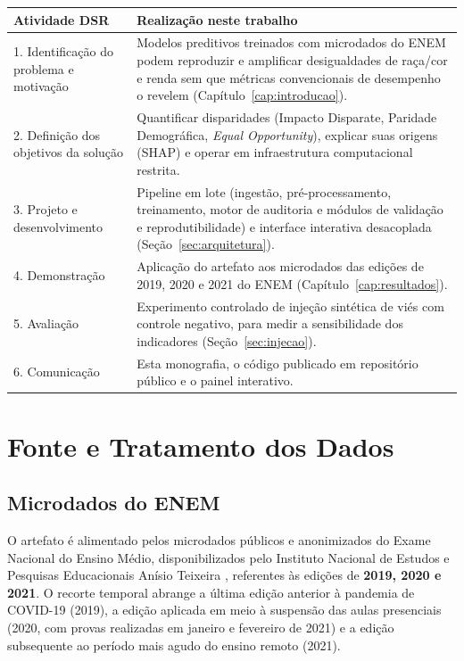 \begin{quadro}[htbp]
\centering
\caption{Mapeamento das atividades da DSR para o presente trabalho}
\label{qua:dsr}
\begin{tabular}{|p{4.2cm}|p{10.3cm}|}
\hline
\textbf{Atividade DSR} & \textbf{Realização neste trabalho} \\ \hline
1. Identificação do problema e motivação & Modelos preditivos treinados com microdados do ENEM podem reproduzir e amplificar desigualdades de raça/cor e renda sem que métricas convencionais de desempenho o revelem (Capítulo~\ref{cap:introducao}). \\ \hline
2. Definição dos objetivos da solução & Quantificar disparidades (Impacto Disparate, Paridade Demográfica, \textit{Equal Opportunity}), explicar suas origens (SHAP) e operar em infraestrutura computacional restrita. \\ \hline
3. Projeto e desenvolvimento & Pipeline em lote (ingestão, pré-processamento, treinamento, motor de auditoria e módulos de validação e reprodutibilidade) e interface interativa desacoplada (Seção~\ref{sec:arquitetura}). \\ \hline
4. Demonstração & Aplicação do artefato aos microdados das edições de 2019, 2020 e 2021 do ENEM (Capítulo~\ref{cap:resultados}). \\ \hline
5. Avaliação & Experimento controlado de injeção sintética de viés com controle negativo, para medir a sensibilidade dos indicadores (Seção~\ref{sec:injecao}). \\ \hline
6. Comunicação & Esta monografia, o código publicado em repositório público e o painel interativo. \\ \hline
\end{tabular}
\end{quadro}

\section{Fonte e Tratamento dos Dados}
\label{sec:dados}

\subsection{Microdados do ENEM}

O artefato é alimentado pelos microdados públicos e anonimizados do Exame Nacional do Ensino Médio, disponibilizados pelo Instituto Nacional de Estudos e Pesquisas Educacionais Anísio Teixeira \cite{inep2022microdados}, referentes às edições de \textbf{2019, 2020 e 2021}. O recorte temporal abrange a última edição anterior à pandemia de COVID-19 (2019), a edição aplicada em meio à suspensão das aulas presenciais (2020, com provas realizadas em janeiro e fevereiro de 2021) e a edição subsequente ao período mais agudo do ensino remoto (2021).

